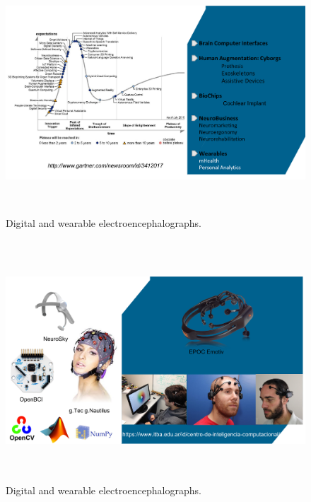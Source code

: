\documentclass[aspectratio=169]{beamer}
\begin{document}
\begin{frame}   
\begin{figure}[]
\centering
\includegraphics[height=9cm,width=1\textwidth]{images/hype.png}
\caption[Wearable portable Digital Electroencephalograph]{Digital and wearable electroencephalographs.}
\label{fig:digitalelectroencephalograph}
\end{figure}
\end{frame}

\begin{frame}   
\begin{figure}[]
\centering
\includegraphics[height=9cm,width=1\textwidth]{images/Cic.png}
\caption[Wearable portable Digital Electroencephalograph]{Digital and wearable electroencephalographs.}
\label{fig:digitalelectroencephalograph}
\end{figure}
\end{frame}  
\end{document}
